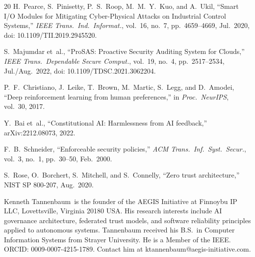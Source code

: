 \documentclass{IEEEcsmag}
\begin{document}
\begin{thebibliography}{20}
H.~Pearce, S.~Pinisetty, P.~S.~Roop, M.~M.~Y.~Kuo, and A.~Ukil, ``Smart I/O Modules for Mitigating Cyber-Physical Attacks on Industrial Control Systems,'' {\it IEEE Trans.\ Ind.\ Informat.}, vol.~16, no.~7, pp.~4659--4669, Jul.\ 2020, doi: 10.1109/TII.2019.2945520.

S.~Majumdar et~al., ``ProSAS: Proactive Security Auditing System for Clouds,'' {\it IEEE Trans.\ Dependable Secure Comput.}, vol.~19, no.~4, pp.~2517--2534, Jul./Aug.\ 2022, doi: 10.1109/TDSC.2021.3062204.

P.~F.~Christiano, J.~Leike, T.~Brown, M.~Martic, S.~Legg, and D.~Amodei, ``Deep reinforcement learning from human preferences,'' in {\it Proc.\ NeurIPS}, vol.~30, 2017.

Y.~Bai et~al., ``Constitutional AI: Harmlessness from AI feedback,'' arXiv:2212.08073, 2022.

F.~B.~Schneider, ``Enforceable security policies,'' {\it ACM Trans.\ Inf.\ Syst.\ Secur.}, vol.~3, no.~1, pp.~30--50, Feb.\ 2000.

S.~Rose, O.~Borchert, S.~Mitchell, and S.~Connelly, ``Zero trust architecture,'' NIST SP 800-207, Aug.\ 2020.

\end{thebibliography}

\begin{IEEEbiography}{Kenneth Tannenbaum}{\,}
is the founder of the AEGIS\texttrademark{} Initiative at Finnoybu IP LLC, Lovettsville, Virginia 20180 USA. His research interests include AI governance architecture, federated trust models, and software reliability principles applied to autonomous systems. Tannenbaum received his B.S.\ in Computer Information Systems from Strayer University. He is a Member of the IEEE. ORCID: 0009-0007-4215-1789. Contact him at ktannenbaum@aegis-initiative.com.
\end{IEEEbiography}
\end{document}
